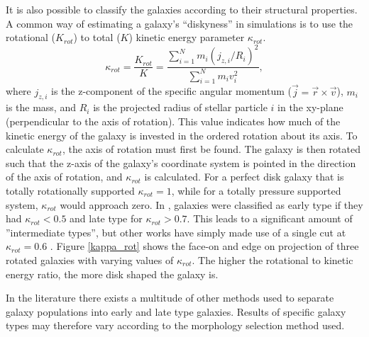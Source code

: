 It is also possible to classify the galaxies according to their structural properties. A common way of estimating a galaxy's ``diskyness'' in simulations is to use the rotational ($K_{rot}$) to total ($K$) kinetic energy parameter $\kappa_{rot}$. 
\begin{equation}
    \kappa_{rot} = \frac{K_{rot}}{K} = \frac{\sum_{i=1}^{N} m_i (j_{z, i}/R_i)^2}{\sum_{i=1}^{N} m_i v_i^2},
\end{equation}
where $j_{z, i}$ is the z-component of the specific angular momentum ($\vec{j} = \vec{r} \times \vec{v}$), $m_i$ is the mass, and $R_i$ is the projected radius of stellar particle $i$ in the xy-plane (perpendicular to the axis of rotation). 
This value indicates how much of the kinetic energy of the galaxy is invested in the ordered rotation about its axis. To calculate $\kappa_{rot}$, the axis of rotation must first be found. The galaxy is then rotated such that the z-axis of the galaxy's coordinate system is pointed in the direction of the axis of rotation, and $\kappa_{rot}$ is calculated.
For a perfect disk galaxy that is totally rotationally supported $\kappa_{rot} = 1$, while for a totally pressure supported system, $\kappa_{rot}$ would approach zero. In \textcite{Sales2012}, galaxies were classified as early type if they had $\kappa_{rot} < 0.5$ and late type for $\kappa_{rot} > 0.7$. This leads to a significant amount of ''intermediate types'', but other works have simply made use of a single cut at $\kappa_{rot} = 0.6$ \parencite{Ferrero2020}. Figure \ref{kappa_rot} shows the face-on and edge on projection of three rotated galaxies with varying values of $\kappa_{rot}$. The higher the rotational to kinetic energy ratio, the more disk shaped the galaxy is.

In the literature there exists a multitude of other methods used to separate galaxy populations into early and late type galaxies. Results of specific galaxy types may therefore vary according to the morphology selection method used.



